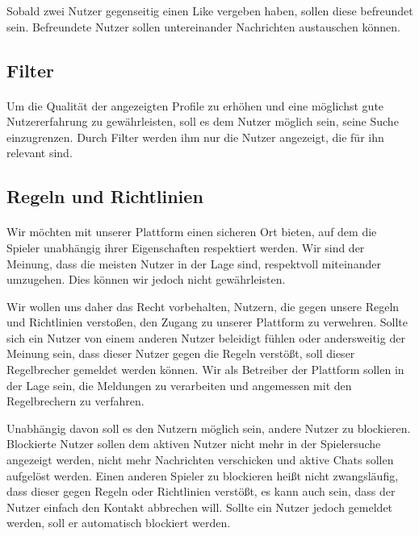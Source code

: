 Sobald zwei Nutzer gegenseitig einen Like vergeben haben, sollen diese befreundet sein. Befreundete Nutzer sollen untereinander Nachrichten austauschen können.

\subsection{Filter}
\paragraph{}
Um die Qualität der angezeigten Profile zu erhöhen und eine möglichst gute Nutzererfahrung zu gewährleisten, soll es dem Nutzer möglich sein, seine Suche einzugrenzen. Durch Filter werden ihm nur die Nutzer angezeigt, die für ihn relevant sind.

\subsection{Regeln und Richtlinien}
\paragraph{}
Wir möchten mit unserer Plattform einen sicheren Ort bieten, auf dem die Spieler unabhängig ihrer Eigenschaften respektiert werden. Wir sind der Meinung, dass die meisten Nutzer in der Lage sind, respektvoll miteinander umzugehen.
Dies können wir jedoch nicht gewährleisten.

Wir wollen uns daher das Recht vorbehalten, Nutzern, die gegen unsere Regeln und Richtlinien verstoßen, den Zugang zu unserer Plattform zu verwehren. Sollte sich ein Nutzer von einem anderen Nutzer beleidigt fühlen oder andersweitig der Meinung sein, dass dieser Nutzer gegen die Regeln verstößt, soll dieser Regelbrecher gemeldet werden können. Wir als Betreiber der Plattform sollen in der Lage sein, die Meldungen zu verarbeiten und angemessen mit den Regelbrechern zu verfahren.

Unabhängig davon soll es den Nutzern möglich sein, andere Nutzer zu blockieren. Blockierte Nutzer sollen dem aktiven Nutzer nicht mehr in der Spielersuche angezeigt werden, nicht mehr Nachrichten verschicken und aktive Chats sollen aufgelöst werden. Einen anderen Spieler zu blockieren heißt nicht zwangsläufig, dass dieser gegen Regeln oder Richtlinien verstößt, es kann auch sein, dass der Nutzer einfach den Kontakt abbrechen will. Sollte ein Nutzer jedoch gemeldet werden, soll er automatisch blockiert werden.

